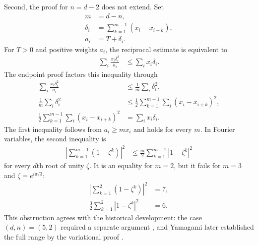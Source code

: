 \documentclass{article}
\begin{document}
Second, the proof for $n=d-2$ does not extend. Set
\begin{align}
    m
        &=d-n,
    \label{eq:wolf_ex3_1_choi_positivity_subcase_scope_complementary_window}\\
    \delta_i
        &=\sum_{k=1}^{m-1}(x_i-x_{i+k}),
    \label{eq:wolf_ex3_1_choi_positivity_subcase_scope_general_delta}\\
    a_i
        &=T+\delta_i.
    \label{eq:wolf_ex3_1_choi_positivity_subcase_scope_general_weight}
\end{align}
For $T>0$ and positive weights $a_i$, the reciprocal estimate is equivalent
to
\begin{align}
    \sum_i\frac{x_i\delta_i^2}{a_i}
        &\leq \sum_i x_i\delta_i.
    \label{eq:wolf_ex3_1_choi_positivity_subcase_scope_equivalent_delta_bound}
\end{align}
The endpoint proof factors this inequality through
\begin{align}
    \sum_i\frac{x_i\delta_i^2}{a_i}
        &\leq \frac{1}{m}\sum_i\delta_i^2,
    \label{eq:wolf_ex3_1_choi_positivity_subcase_scope_first_delta_step}\\
    \frac{1}{m}\sum_i\delta_i^2
        &\leq
        \frac{1}{2}\sum_{k=1}^{m-1}
            \sum_i(x_i-x_{i+k})^2,
    \label{eq:wolf_ex3_1_choi_positivity_subcase_scope_second_delta_step}\\
    \frac{1}{2}\sum_{k=1}^{m-1}
            \sum_i(x_i-x_{i+k})^2
        &=\sum_i x_i\delta_i.
    \label{eq:wolf_ex3_1_choi_positivity_subcase_scope_delta_energy_identity}
\end{align}
The first inequality follows from $a_i\geq mx_i$ and holds for every $m$. In
Fourier variables, the second inequality is
\begin{align}
    \left|\sum_{k=1}^{m-1}(1-\zeta^k)\right|^2
        &\leq
        \frac{m}{2}\sum_{k=1}^{m-1}|1-\zeta^k|^2
    \label{eq:wolf_ex3_1_choi_positivity_subcase_scope_fourier_endpoint_bound}
\end{align}
for every $d$th root of unity $\zeta$. It is an equality for $m=2$, but it
fails for $m=3$ and $\zeta=e^{i\pi/3}$:
\begin{align}
    \left|\sum_{k=1}^{2}(1-\zeta^k)\right|^2
        &=7,
    \label{eq:wolf_ex3_1_choi_positivity_subcase_scope_fourier_counterexample_left}\\
    \frac{3}{2}\sum_{k=1}^{2}|1-\zeta^k|^2
        &=6.
    \label{eq:wolf_ex3_1_choi_positivity_subcase_scope_fourier_counterexample_right}
\end{align}
This obstruction agrees with the historical development: the case
$(d,n)=(5,2)$ required a separate argument
\cite{Osaka1991Indecomposable}, and Yamagami later established the full range
by the variational proof \cite{Yamagami1993Cyclic}.
\end{document}
